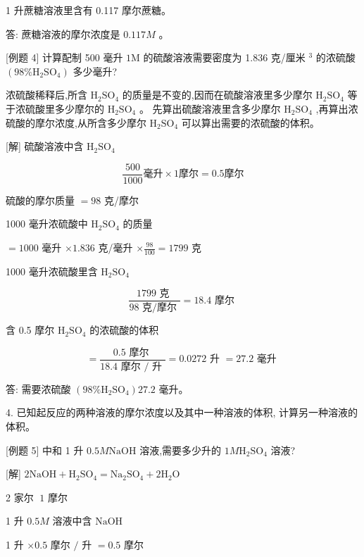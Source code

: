 \documentclass[10pt]{article}
\begin{document}
1 升蔗糖溶液里含有 0.117 摩尔蔗糖。

答: 蔗糖溶液的摩尔浓度是 \({0.117M}\) 。

[例题 4] 计算配制 500 毫升 \(1\mathrm{M}\) 的硫酸溶液需要密度为 1.836 克/厘米 \({}^{3}\) 的浓硫酸 \(\left( {{98}\% {\mathrm{H}}_{2}{\mathrm{{SO}}}_{4}}\right)\) 多少毫升?

浓硫酸稀释后,所含 \({\mathrm{H}}_{2}{\mathrm{{SO}}}_{4}\) 的质量是不变的,因而在硫酸溶液里多少摩尔 \({\mathrm{H}}_{2}{\mathrm{{SO}}}_{4}\) 等于浓硫酸里多少摩尔的 \({\mathrm{H}}_{2}{\mathrm{{SO}}}_{4}\) 。 先算出硫酸溶液里含多少摩尔 \({\mathrm{H}}_{2}{\mathrm{{SO}}}_{4}\) ,再算出浓硫酸的摩尔浓度,从所含多少摩尔 \({\mathrm{H}}_{2}{\mathrm{{SO}}}_{4}\) 可以算出需要的浓硫酸的体积。

[解] 硫酸溶液中含 \({\mathrm{H}}_{2}{\mathrm{{SO}}}_{4}\)

\[
\frac{500}{1000}\text{毫升} \times 1\text{摩尔} = {0.5}\text{摩尔}
\]

硫酸的摩尔质量 \(= {98}\) 克/摩尔

1000 毫升浓硫酸中 \({\mathrm{H}}_{2}{\mathrm{{SO}}}_{4}\) 的质量

\(= {1000}\) 毫升 \(\times {1.836}\) 克/毫升 \(\times \frac{98}{100} = {1799}\) 克

1000 毫升浓硫酸里含 \({\mathrm{H}}_{2}{\mathrm{{SO}}}_{4}\)

\[
\frac{{1799}\text{ 克 }}{{98}\text{ 克/摩尔 }} = {18.4}\text{ 摩尔 }
\]

含 0.5 摩尔 \({\mathrm{H}}_{2}{\mathrm{{SO}}}_{4}\) 的浓硫酸的体积

\[
= \frac{{0.5}\text{ 摩尔 }}{{18.4}\text{ 摩尔 }/\text{ 升 }} = {0.0272}\text{ 升 } = {27.2}\text{ 毫升 }
\]

答: 需要浓硫酸 \(\left( {{98}\% {\mathrm{H}}_{2}{\mathrm{{SO}}}_{4}}\right) {27.2}\) 毫升。

4. 已知起反应的两种溶液的摩尔浓度以及其中一种溶液的体积, 计算另一种溶液的体积。

[例题 5] 中和 1 升 \({0.5M}\mathrm{{NaOH}}\) 溶液,需要多少升的 \({1M}{\mathrm{H}}_{2}{\mathrm{{SO}}}_{4}\) 溶液?

[解] \(2\mathrm{{NaOH}} + {\mathrm{H}}_{2}{\mathrm{{SO}}}_{4} = {\mathrm{{Na}}}_{2}{\mathrm{{SO}}}_{4} + 2{\mathrm{H}}_{2}\mathrm{O}\)

2 家尔 \(\;1\) 摩尔

1 升 \({0.5M}\) 溶液中含 \(\mathrm{{NaOH}}\)

1 升 \(\times {0.5}\) 摩尔 \(/\) 升 \(= {0.5}\) 摩尔
\end{document}
